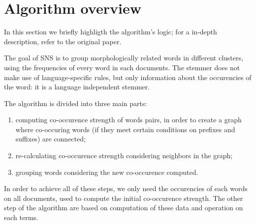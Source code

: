 \section{Algorithm overview}
    In this section we briefly highligth the algorithm's logic; for a in-depth description, refer to the original paper\cite{sns}.
 
    The goal of SNS is to group morphologically related words in different clusters, using the frequencies of every word in each documents. The stemmer does not make use of language-specific rules, but only information about the occurencies of the word: it is a language independent stemmer.
    
The algorithm is divided into three main parts:

    \begin{enumerate}
        \item computing co-occurence strength of words pairs, in order to create a graph where co-occuring words (if they meet certain conditions on prefixes and suffixes) are connected;
        \item re-calculating co-occurence strength considering neighbors in the graph;
        \item grouping words considering the new co-occurence computed.
    \end{enumerate}

    In order to achieve all of these steps, we only need the occurencies of each words on all documents, used to compute the initial co-occurence strength. The other step of the algorithm are based on computation of these data and operation on each terms. 